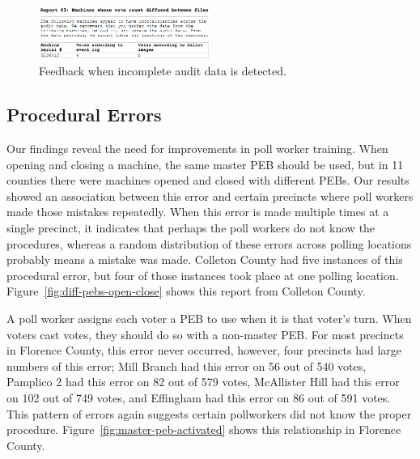 \documentclass[letterpaper,twocolumn,10pt]{article}
\begin{document}
\begin{figure}[htbp]
\begin{center}
    \includegraphics[width=0.5\textwidth,height=0.2\textheight]{IncompleteAuditData.eps}
\end{center}
\caption{Feedback when incomplete audit data is detected.}
\label{fig:incomplete-audit-data}
\end{figure}


\subsection{Procedural Errors}
Our findings reveal the need for improvements in poll worker training. When
opening and closing a machine, the same master PEB should be used, but in 11
counties there were machines opened and closed with different PEBs. Our results
showed an association between this error and certain precincts where poll workers
made those mistakes repeatedly.  
When this error is made multiple times at a single precinct, it indicates 
that perhaps the poll workers do
not know the procedures, whereas a random distribution of these errors across
polling locations probably means a mistake was made. Colleton County had five
instances of this procedural error, but four of those instances took place at
one polling location. Figure~\ref{fig:diff-pebs-open-close} shows this report
from Colleton County.  

A poll worker assigns each voter a PEB to use when it is that voter's turn. When 
voters cast votes, they should do so with a non-master PEB. For most precincts
in Florence County, this error never occurred, however, four precincts had large
numbers of this error; Mill Branch had  
this error on 56 out of 540 votes, Pamplico 2 had this error on 82 out of 579 
votes, McAllister Hill had this error on 102 out of 749 votes, and Effingham 
had this error on 86 out of 591 votes. This pattern of errors again suggests
certain pollworkers did not know the proper
procedure. Figure~\ref{fig:master-peb-activated}  
shows this relationship in Florence County. 
\end{document}
